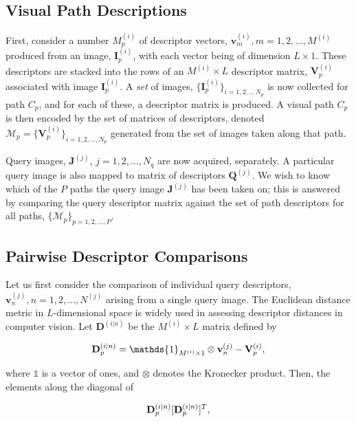 \subsection{Visual Path Descriptions} First, consider a number $M_p^{(i)}$ of descriptor vectors, $\mathbf{v}_m^{(i)}, m=1,2,\ldots,M^{(i)}$ produced from an image, $\mathbf{I}^{(i)}_p$, with each vector being of  dimension $L \times 1$.  These descriptors are stacked into the rows of an $M^{(i)}\times L$ descriptor matrix, $\mathbf{V}^{(i)}_p$ associated with image $\mathbf{I}^{(i)}_p$.  A \textit{set} of images, $\lbrace \mathbf{I}^{(i)}_p\rbrace_{i=1,2,\ldots\,N_p}$ is now collected for path $C_p$, and for each of these, a descriptor matrix is produced.  A visual path $C_p$ is then encoded by the set of matrices of descriptors, denoted $\mathcal{M}_p=\lbrace \mathbf{V}^{(i)}_p \rbrace_{i=1,2,\ldots,N_p}$ generated from the set of images taken along that path.
 
Query images, $\mathbf{J}^{(j)}$, $j=1,2,\ldots,N_q$ are now acquired, separately.  A particular query image is also mapped to matrix of descriptors $\mathbf{Q}^{(j)}$. We wish to know which of the $P$ paths the query image $\mathbf{J}^{(j)}$ has been taken on; this is answered by comparing the query descriptor matrix against the set of path descriptors for all paths, $\lbrace \mathcal{M}_p \rbrace_{p=1,2,\ldots, P}$.

\subsection{Pairwise Descriptor Comparisons} \label{subsec:pairwise}

Let us first consider the comparison of individual query descriptors, $\mathbf{v}_n^{(j)}, n=1,2,\ldots,N^{(j)}$ arising from a single query image.  The Euclidean distance metric in $L$-dimensional space is widely used in assessing descriptor distances in computer vision.  Let $\mathbf{D}^{(i|n)}$ be the $M^{(i)}\times L$ matrix defined by

\begin{equation}
\centering
\mathbf{D}^{(i|n)}_p =  \mathds{1}_{M^{(i)}\times 1} \otimes \mathbf{v}_n^{(j)} - \mathbf{V}^{(i)}_p,
\end{equation}

where $\mathds{1}$ is a vector of ones, and $\otimes$ denotes the Kronecker product.
Then, the elements along the diagonal of

\begin{equation}
\centering
 \mathbf{D}^{(i|n)}_p[\mathbf{D}^{(i|n)}_p]^T,
\end{equation}

